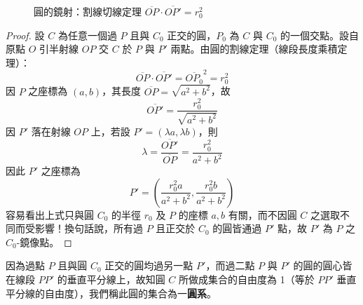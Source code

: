 \begin{figure}[htbp]
\centering
{}
\caption{圓的鏡射：割線切線定理 $\overline{OP} \cdot \overline{OP'} = r_0^2$}
\label{fig:b4-3-40}
\end{figure}

\begin{proof}
設 $C$ 為任意一個過 $P$ 且與 $C_0$ 正交的圓，$P_0$ 為 $C$ 與 $C_0$ 的一個交點。設自原點 $O$ 引半射線 $OP$ 交 $C$ 於 $P$ 與 $P'$ 兩點。由圓的割線定理（線段長度乘積定理）：
\[ \overline{OP} \cdot \overline{OP'} = \overline{OP_0}^2 = r_0^2 \]
因 $P$ 之座標為 $(a,b)$，其長度 $\overline{OP} = \sqrt{a^2 + b^2}$，故
\[ \overline{OP'} = \frac{r_0^2}{\sqrt{a^2 + b^2}} \]
因 $P'$ 落在射線 $OP$ 上，若設 $P' = (\lambda a, \lambda b)$，則
\[ \lambda = \frac{\overline{OP'}}{\overline{OP}} = \frac{r_0^2}{a^2 + b^2} \]
因此 $P'$ 之座標為
\[ P' = \left(\frac{r_0^2 a}{a^2 + b^2}, \frac{r_0^2 b}{a^2 + b^2}\right) \]
容易看出上式只與圓 $C_0$ 的半徑 $r_0$ 及 $P$ 的座標 $a, b$ 有關，而不因圓 $C$ 之選取不同而受影響！換句話說，所有過 $P$ 且正交於 $C_0$ 的圓皆通過 $P'$ 點，故 $P'$ 為 $P$ 之 $C_0$-鏡像點。
\end{proof}

因為過點 $P$ 且與圓 $C_0$ 正交的圓均過另一點 $P'$，而過二點 $P$ 與 $P'$ 的圓的圓心皆在線段 $PP'$ 的垂直平分線上，故知圓 $C$ 所做成集合的自由度為 1（等於 $PP'$ 垂直平分線的自由度），我們稱此圓的集合為一\textbf{圓系}。

